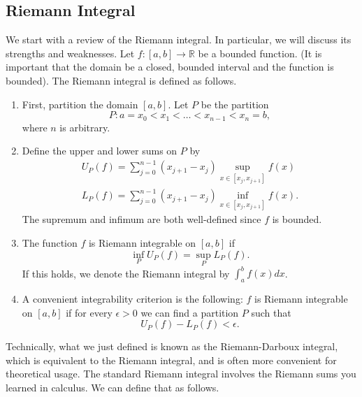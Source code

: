 \documentclass[12pt]{amsart}         %
\theoremstyle{remark}
\newcommand{\R}{\mathbb{R}}
\begin{document}
\subsection{Riemann Integral}

We start with a review of the Riemann integral. In particular, we will discuss its strengths and weaknesses. Let $f: [a, b] \rightarrow \R$ be a bounded function. (It is important that the domain be a closed, bounded interval and the function is bounded). The Riemann integral is defined as follows.
\begin{enumerate}
    \item First, partition the domain $[a,b]$. Let $P$ be the partition
    \[
    P: a = x_0 < x_1 < \dots < x_{n-1} < x_n = b,
    \]
    where $n$ is arbitrary.
    \item Define the upper and lower sums on $P$ by
    \begin{align*}
        U_P(f) = \sum_{j = 0}^{n-1} (x_{j+1} - x_j) \sup_{x \in [x_j, x_{j+1}]} f(x) \\
        L_P(f) = \sum_{j = 0}^{n-1} (x_{j+1} - x_j) \inf_{x \in [x_j, x_{j+1}]} f(x).
    \end{align*}
    The supremum and infimum are both well-defined since $f$ is bounded.
    \item The function $f$ is Riemann integrable on $[a,b]$ if
    \[
    \inf_P U_P(f) = \sup_P L_P(f).
    \]
    If this holds, we denote the Riemann integral by $\int_a^b f(x) dx$.
    \item A convenient integrability criterion is the following: $f$ is Riemann integrable on $[a, b]$ if for every $\epsilon > 0$ we can find a partition $P$ such that
    \[
    U_P(f) - L_P(f) < \epsilon.
    \]
\end{enumerate}
Technically, what we just defined is known as the Riemann-Darboux integral, which is equivalent to the Riemann integral, and is often more convenient for theoretical usage. The standard Riemann integral involves the Riemann sums you learned in calculus. We can define that as follows.
\end{document}
